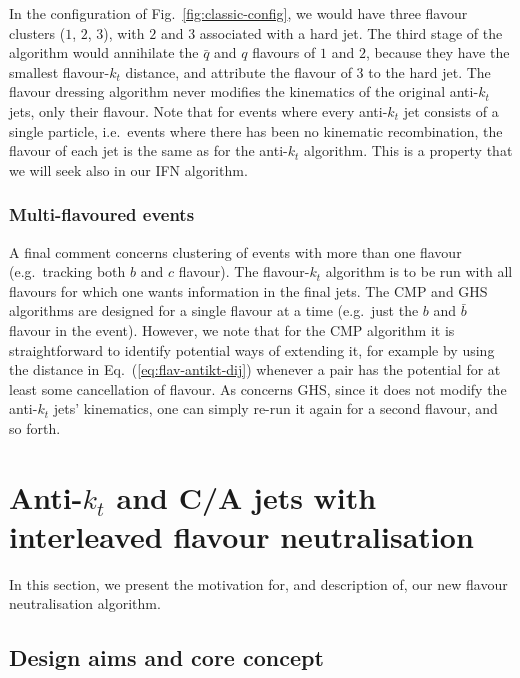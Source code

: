 \documentclass[nofootinbib,twocolumn,preprintnumbers,superscriptaddress,aps]{revtex4-2}
\begin{document}
In the configuration of Fig.~\ref{fig:classic-config}, we would have
three flavour clusters ($1$, $2$, $3$), with $2$ and $3$ associated
with a hard jet.
%
The third stage of the algorithm would annihilate the $\bar q$ and $q$
flavours of $1$ and $2$, because they have the smallest flavour-$k_t$
distance, and attribute the flavour of $3$ to the hard jet.
%
The flavour dressing algorithm never modifies the kinematics of the
original anti-$k_t$ jets, only their flavour.
%
Note that for events where every anti-$k_t$ jet consists of a single
particle, i.e.\ events where there has been no kinematic
recombination, the flavour of each jet is the same as for the
anti-$k_t$ algorithm.
%
This is a property that we will seek also in our IFN algorithm.

\subsubsection{Multi-flavoured events}


A final comment concerns clustering of events with more than one
flavour (e.g.\ tracking both $b$ and $c$ flavour). 
%
The flavour-$k_t$ algorithm is to be run with all flavours
for which one wants information in the final jets.
%
The CMP and GHS algorithms are designed for a single flavour at a time
(e.g.\ just the $b$ and $\bar b$ flavour in the event).
%
However, we note that for the CMP algorithm it is straightforward to
identify potential ways of extending it, for example by using the
distance in Eq.~(\ref{eq:flav-antikt-dij}) whenever a pair has the
potential for at least some cancellation of flavour.
%
As concerns GHS, since it does not modify the anti-$k_t$ jets'
kinematics, one can simply re-run it again for a second flavour, and
so forth.


\section{Anti-$k_t$ and C/A jets with interleaved flavour
  neutralisation}
\label{sec:genkt-FN}

In this section, we present the motivation for, and description of, our new flavour neutralisation algorithm.

\subsection{Design aims and core concept}
\end{document}
